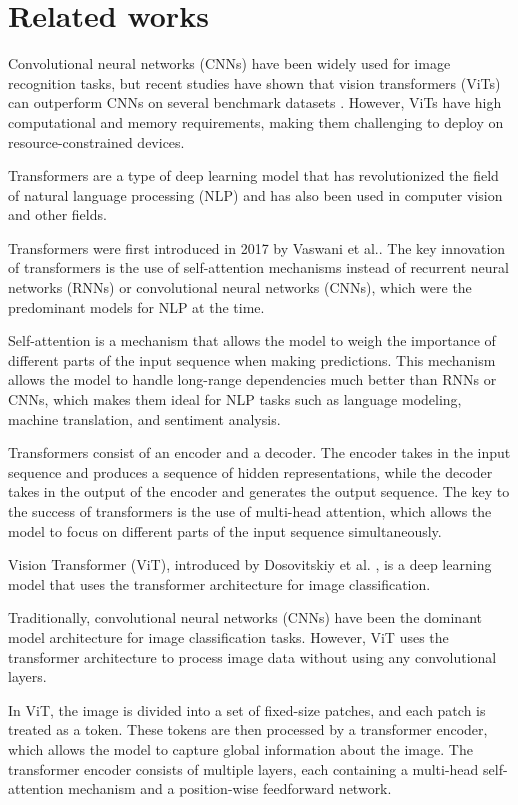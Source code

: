 \section{Related works}
\label{relatedwork}
Convolutional neural networks (CNNs) have been widely used for image recognition tasks, but recent studies have shown that vision transformers (ViTs) can outperform CNNs on several benchmark datasets \cite{9790134}. However, ViTs have high computational and memory requirements, making them challenging to deploy on resource-constrained devices.



Transformers are a type of deep learning model that has revolutionized the field of natural language processing (NLP) and has also been used in computer vision and other fields.

Transformers were first introduced in 2017 by Vaswani et al.\cite{DBLP:journals/corr/VaswaniSPUJGKP17}. The key innovation of transformers is the use of self-attention mechanisms instead of recurrent neural networks (RNNs) or convolutional neural networks (CNNs), which were the predominant models for NLP at the time.

Self-attention is a mechanism that allows the model to weigh the importance of different parts of the input sequence when making predictions. This mechanism allows the model to handle long-range dependencies much better than RNNs or CNNs, which makes them ideal for NLP tasks such as language modeling, machine translation, and sentiment analysis.

Transformers consist of an encoder and a decoder. The encoder takes in the input sequence and produces a sequence of hidden representations, while the decoder takes in the output of the encoder and generates the output sequence. The key to the success of transformers is the use of multi-head attention, which allows the model to focus on different parts of the input sequence simultaneously.

Vision Transformer (ViT), introduced by Dosovitskiy et al.  \cite{DBLP:journals/corr/abs-2010-11929}, is a deep learning model that uses the transformer architecture for image classification. 

Traditionally, convolutional neural networks (CNNs) have been the dominant model architecture for image classification tasks. However, ViT uses the transformer architecture to process image data without using any convolutional layers.

In ViT, the image is divided into a set of fixed-size patches, and each patch is treated as a token. These tokens are then processed by a transformer encoder, which allows the model to capture global information about the image. The transformer encoder consists of multiple layers, each containing a multi-head self-attention mechanism and a position-wise feedforward network.

